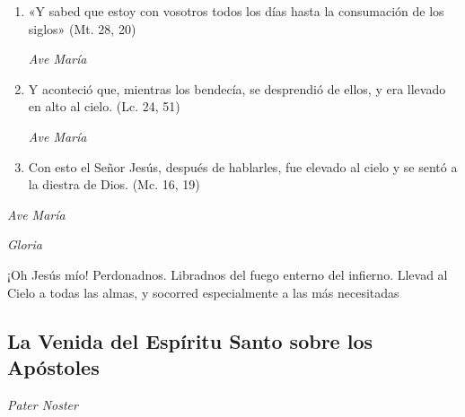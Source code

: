 \documentclass[a4paper,11pt, oneside]{report}
\begin{document}
\begin{enumerate}
          \item «Y sabed que estoy con vosotros todos los días hasta la consumación de los siglos» (Mt. 28, 20)

          \textit{Ave María}

          \item Y aconteció que, mientras los bendecía, se desprendió de ellos, y era llevado en alto al cielo. (Lc. 24, 51)

          \textit{Ave María}

          \item Con esto el Señor Jesús, después de hablarles, fue elevado al cielo y se sentó a la diestra de Dios. (Mc. 16, 19)

        \end{enumerate}

        \textit{Ave María} \par
        \indent\textit{Gloria} \par
        \indent¡Oh Jesús mío! Perdonadnos. Libradnos del fuego enterno del infierno. Llevad al Cielo a todas las almas, y socorred especialmente a las más 
        necesitadas

      \subsection*{La Venida del Espíritu Santo sobre los Apóstoles}

        \textit{Pater Noster}
\end{document}
